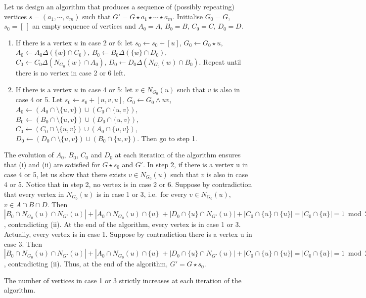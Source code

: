 \documentclass[a4paper,UKenglish,cleveref,autoref,thm-restate]{arxiv}
\newcommand{\sm}{\setminus}
\begin{document}
Let us design an algorithm that produces a sequence of (possibly repeating) vertices $s = (a_1, \cdots, a_m)$ such that $G' = G \star a_1 \star \cdots \star a_m$. Initialise $G_0 = G$, $s_0 = [~]$ an empty sequence of vertices and $A_0 = A$, $B_0 = B$, $C_0 = C$, $D_0 = D$.

\begin{enumerate}
    \item If there is a vertex $u$ in case 2 or 6: let $s_0 \leftarrow s_0 + [u]$, $G_0 \leftarrow G_0 \star u$, $A_0 \leftarrow A_0 \Delta ( \{w\}\cap C_0)$, $B_0 \leftarrow B_0 \Delta ( \{w\}\cap D_0)$, $C_0 \leftarrow C_0 \Delta ( N_{G_0}(w)\cap A_0)$, $D_0 \leftarrow D_0 \Delta ( N_{G_0}(w)\cap B_0)$. Repeat until there is no vertex in case 2 or 6 left. 
    \item If there is a vertex $u$ in case 4 or 5: let $v \in N_{G_0}(u)$ such that $v$ is also in case 4 or 5. 
    Let $s_0 \leftarrow s_0 + [u, v, u]$, $G_0 \leftarrow G_0 \wedge u v$, $A_0 \leftarrow (A_0 \cap \sm \{u,v\}) \cup (C_0 \cap \{u,v\})$, $B_0 \leftarrow (B_0 \cap \sm \{u,v\}) \cup (D_0 \cap \{u,v\})$, $C_0 \leftarrow (C_0 \cap \sm \{u,v\}) \cup (A_0 \cap \{u,v\})$, $D_0 \leftarrow (D_0 \cap \sm \{u,v\}) \cup (B_0 \cap \{u,v\})$. Then go to step 1.
\end{enumerate}

 The evolution of $A_0$, $B_0$, $C_0$ and $D_0$ at each iteration of the algorithm ensures that (i) and (ii) are satisfied for $G \star s_0$ and $G'$. In step 2, if there is a vertex u in case 4 or 5, let us show that there exists $v \in N_{G_0}(u)$ such that $v$ is also in case 4 or 5. Notice that in step 2, no vertex is in case 2 or 6. Suppose by contradiction that every vertex in $N_{G_0}(u)$ is in case 1 or 3, i.e.~for every $v \in N_{G_0}(u)$, $v \in A \cap \overline B  \cap D$. Then $|B_0\cap N_{G_0}(u)\cap N_{G'}(u)| + |A_0\cap N_{G_0}(u)\cap \{u\}| +  |D_0\cap \{u\}\cap N_{G'}(u)| + |C_0\cap \{u\}\cap \{u\}| = |C_0 \cap \{u\}| = 1 \bmod 2$, contradicting (ii). At the end of the algorithm, every vertex is in case 1 or 3. Actually, every vertex is in case 1. Suppose by contradiction there is a vertex u in case 3. Then $|B_0\cap N_{G_0}(u)\cap N_{G'}(u)| + |A_0\cap N_{G_0}(u)\cap \{u\}| +  |D_0\cap \{u\}\cap N_{G'}(u)| + |C_0\cap \{u\}\cap \{u\}|  = |C_0 \cap \{u\}| = 1 \bmod 2$, contradicting (ii). Thus, at the end of the algorithm, $G' = G \star s_0$.

 The number of vertices in case 1 or 3 strictly increases at each iteration of the algorithm.
\end{document}
